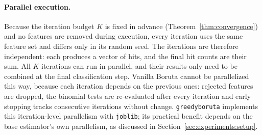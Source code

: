 \documentclass[runningheads]{llncs}
\begin{document}
\paragraph{Parallel execution.}
\label{sec:method:parallel}
Because the iteration budget $K$ is fixed in advance (Theorem~\ref{thm:convergence}) and no features are removed during execution, every iteration uses the same feature set and differs only in its random seed. The iterations are therefore independent: each produces a vector of hits, and the final hit counts are their sum. All $K$ iterations can run in parallel, and their results only need to be combined at the final classification step. Vanilla Boruta cannot be parallelized this way, because each iteration depends on the previous ones: rejected features are dropped, the binomial tests are re-evaluated after every iteration and early stopping tracks consecutive iterations without change. \texttt{greedyboruta} implements this iteration-level parallelism with \texttt{joblib}; its practical benefit depends on the base estimator's own parallelism, as discussed in Section~\ref{sec:experiments:setup}.

\end{document}

